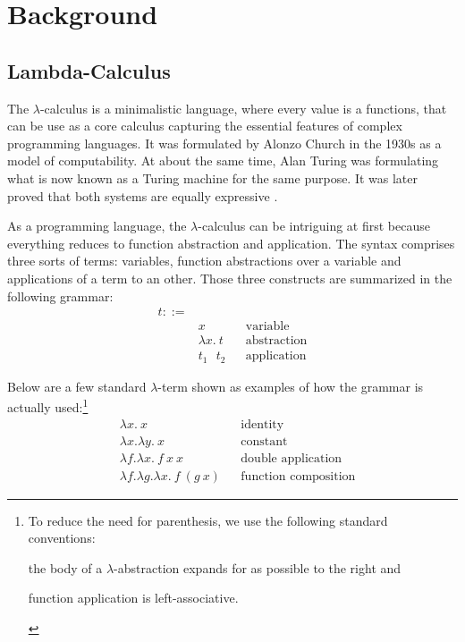 \section{Background}
\label{sec:background}

\subsection{Lambda-Calculus}
\label{sec:background-lambda-calculus}

The $\lambda$-calculus is a minimalistic language, where every value is a functions, that can be use
as a core calculus capturing the essential features of complex programming
languages. It was formulated by Alonzo Church \cite{church-1936-unsolvable-problem} in
the 1930s as a model of computability. At about the same time, Alan Turing was
formulating what is now known as a Turing machine
\cite{turing-1936-on-computable-numbers} for the same purpose. It was later
proved that both systems are equally expressive
\cite{turing-1937-computability}.

As a programming language, the $\lambda$-calculus can be intriguing at first because everything
reduces to function abstraction and application. The syntax comprises three sorts of terms:
variables, function abstractions over a variable and applications of a term to an other. Those three
constructs are summarized in the following grammar:
\begin{align*}
  t ::= & \\
    & x && \text{variable} \\
    & \lambda x. \ t && \text{abstraction} \\
    & t_1 \text{ } t_2 && \text{application}
\end{align*}

Below are a few standard $\lambda$-term shown as examples of how the grammar is actually
used:\footnote{To reduce the need for parenthesis, we use the following standard conventions:
\begin{enumerate*}[label=(\arabic*)]
  \item the body of a $\lambda$-abstraction expands for as possible to the right and
  \item function application is left-associative.
\end{enumerate*}}
\begin{align*}
  & \lambda x. \ x && \text{identity} \\
  & \lambda x. \lambda y. \ x && \text{constant} \\
  & \lambda f. \lambda x. \ f \ x \ x && \text{double application} \\
  & \lambda f. \lambda g. \lambda x. \ f \ (g \ x) && \text{function composition}
\end{align*}

